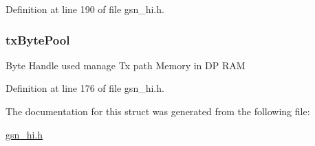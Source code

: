 Definition at line 190 of file gsn\_\-hi.h.

\hypertarget{a00085_a2ca067fff9b5c9e1fa76fefc0bce7ad5}{
\subsubsection[{txBytePool}]{ {\bf txBytePool}}}
\label{a00085_a2ca067fff9b5c9e1fa76fefc0bce7ad5}
Byte Handle used manage Tx path Memory in DP RAM 

Definition at line 176 of file gsn\_\-hi.h.



The documentation for this struct was generated from the following file:\begin{DoxyCompactItemize}
\item 
\hyperlink{a00504}{gsn\_\-hi.h}\end{DoxyCompactItemize}
